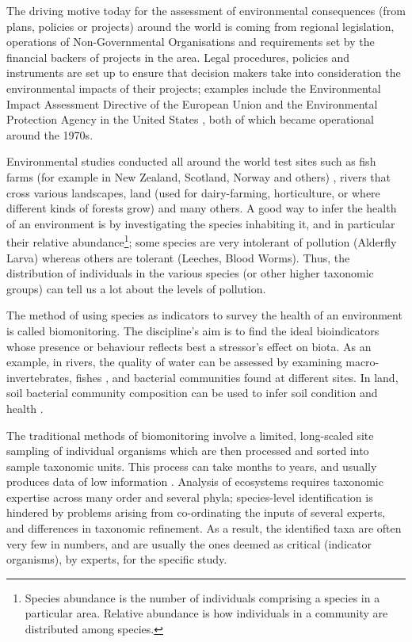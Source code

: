  The driving motive today for the assessment of environmental consequences (from plans, policies or projects) around the world is coming from regional legislation, operations of Non-Governmental Organisations and requirements set by the financial backers of projects in the area. Legal procedures, policies and instruments are set up to ensure that decision makers take into consideration the environmental impacts of their projects; examples include the Environmental Impact Assessment Directive of the European Union \cite{eia_eu} and the Environmental Protection Agency in the United States \cite{us_epa_our_2013}, both of which became operational around the 1970s.
 
 

Environmental studies conducted all around the world test sites such as fish farms (for example in New Zealand, Scotland, Norway and others) \cite{stoeck_environmental_2018}, rivers that cross various landscapes, land (used for dairy-farming, horticulture, or where different kinds of forests grow)\cite{hermans_bacteria_2016} and many others. A good way to infer the health of an environment is by investigating the species inhabiting it, and in particular their relative abundance\footnote{Species abundance is the number of individuals comprising a species in a particular area. Relative abundance is how individuals in a community are distributed among species.}; some species are very intolerant of pollution (Alderfly Larva) whereas others are tolerant (Leeches, Blood Worms). Thus, the distribution of individuals in the various species (or other higher taxonomic groups) can tell us a lot about the levels of pollution. 

The method of using species as indicators to survey the health of an environment is called biomonitoring. The discipline's aim is to find the ideal bioindicators whose presence or behaviour reflects best a stressor's effect on biota. As an example, in rivers, the quality of water can be assessed by examining macro-invertebrates, fishes \cite{bioindicatorsinrivers}, and bacterial communities \cite{stoeck_environmental_2018} found at different sites. In land, soil bacterial community composition can be used to infer soil condition and health \cite{hermans_bacteria_2016}.

The traditional methods of biomonitoring involve a limited, long-scaled site sampling of individual organisms which are then processed and sorted into sample taxonomic units. This process can take months to years, and usually produces data of low information \cite{baird_biomonitoring_2012}. Analysis of ecosystems requires taxonomic expertise across many order and several phyla; species-level identification is hindered by problems arising from co-ordinating the inputs of several experts, and differences in taxonomic refinement. As a result, the identified taxa are often very few in numbers, and are usually the ones deemed as critical (indicator organisms), by experts, for the specific study\cite{cranston_biomonitoring_1990}. 


